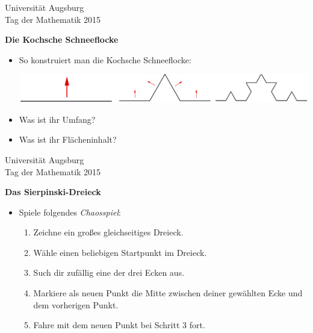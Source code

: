 \documentclass[a4paper,ngerman]{scrartcl}
\newcommand{\drawHere}{%
  \begin{center}%
    \fbox{\parbox[c][0.9\textwidth]{0.9\textwidth}{\ }}%
  \end{center}}
\newcommand{\header}{%
  \begin{raggedleft}
  \tiny Universität Augsburg \\
  Tag der Mathematik 2015 \par
  \end{raggedleft}}
\begin{document}
\newpage

\header

\begin{center}
  \Huge\bf
  Die Kochsche Schneeflocke
\end{center}

\vfill
\drawHere

\vfill
\Large

\renewcommand{\labelitemi}{$\bigstar$}

\begin{itemize}
  \item So konstruiert man die Kochsche Schneeflocke:

  \begin{center}
    \includegraphics[scale=0.5]{koch}
  \end{center}
  \item Was ist ihr Umfang?
  \item Was ist ihr Flächeninhalt?
\end{itemize}

\newpage


\header

\begin{center}
  \Huge\bf
  Das Sierpinski-Dreieck
\end{center}

\vfill
\drawHere

\vfill
\Large

\renewcommand{\labelitemi}{$\blacktriangle$}

\begin{itemize}
  \item Spiele folgendes \emph{Chaosspiel}:
  \begin{enumerate}
    \item Zeichne ein großes gleichseitiges Dreieck.
    \item Wähle einen beliebigen Startpunkt im Dreieck.
    \item Such dir zufällig eine der drei Ecken aus.
    \item Markiere als neuen Punkt die Mitte zwischen deiner gewählten Ecke und \\ dem
    vorherigen Punkt.
    \item Fahre mit dem neuen Punkt bei Schritt 3 fort.
  \end{enumerate}
\end{itemize}
\end{document}
